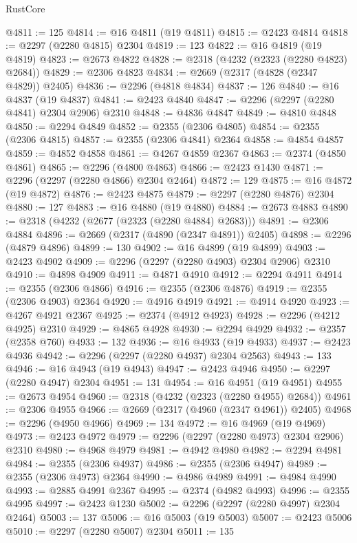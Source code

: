 \begin{lexlean}{RustCore}
\begin{coremodule}
@4811 := 125
@4814 := @16 @4811 (@19 @4811)
@4815 := @2423 @4814
@4818 := @2297 (@2280 @4815) @2304
@4819 := 123
@4822 := @16 @4819 (@19 @4819)
@4823 := @2673 @4822
@4828 := @2318 (@4232 (@2323 (@2280 @4823) @2684))
@4829 := @2306 @4823
@4834 := @2669 (@2317 (@4828 (@2347 @4829)) @2405)
@4836 := @2296 (@4818 @4834)
@4837 := 126
@4840 := @16 @4837 (@19 @4837)
@4841 := @2423 @4840
@4847 := @2296 (@2297 (@2280 @4841) @2304 @2906) @2310
@4848 := @4836 @4847
@4849 := @4810 @4848
@4850 := @2294 @4849
@4852 := @2355 (@2306 @4805)
@4854 := @2355 (@2306 @4815)
@4857 := @2355 (@2306 @4841) @2364
@4858 := @4854 @4857
@4859 := @4852 @4858
@4861 := @4267 @4859 @2367
@4863 := @2374 (@4850 @4861)
@4865 := @2296 (@4800 @4863)
@4866 := @2423 @1430
@4871 := @2296 (@2297 (@2280 @4866) @2304 @2464)
@4872 := 129
@4875 := @16 @4872 (@19 @4872)
@4876 := @2423 @4875
@4879 := @2297 (@2280 @4876) @2304
@4880 := 127
@4883 := @16 @4880 (@19 @4880)
@4884 := @2673 @4883
@4890 := @2318 (@4232 (@2677 (@2323 (@2280 @4884) @2683)))
@4891 := @2306 @4884
@4896 := @2669 (@2317 (@4890 (@2347 @4891)) @2405)
@4898 := @2296 (@4879 @4896)
@4899 := 130
@4902 := @16 @4899 (@19 @4899)
@4903 := @2423 @4902
@4909 := @2296 (@2297 (@2280 @4903) @2304 @2906) @2310
@4910 := @4898 @4909
@4911 := @4871 @4910
@4912 := @2294 @4911
@4914 := @2355 (@2306 @4866)
@4916 := @2355 (@2306 @4876)
@4919 := @2355 (@2306 @4903) @2364
@4920 := @4916 @4919
@4921 := @4914 @4920
@4923 := @4267 @4921 @2367
@4925 := @2374 (@4912 @4923)
@4928 := @2296 (@4212 @4925) @2310
@4929 := @4865 @4928
@4930 := @2294 @4929
@4932 := @2357 (@2358 @760)
@4933 := 132
@4936 := @16 @4933 (@19 @4933)
@4937 := @2423 @4936
@4942 := @2296 (@2297 (@2280 @4937) @2304 @2563)
@4943 := 133
@4946 := @16 @4943 (@19 @4943)
@4947 := @2423 @4946
@4950 := @2297 (@2280 @4947) @2304
@4951 := 131
@4954 := @16 @4951 (@19 @4951)
@4955 := @2673 @4954
@4960 := @2318 (@4232 (@2323 (@2280 @4955) @2684))
@4961 := @2306 @4955
@4966 := @2669 (@2317 (@4960 (@2347 @4961)) @2405)
@4968 := @2296 (@4950 @4966)
@4969 := 134
@4972 := @16 @4969 (@19 @4969)
@4973 := @2423 @4972
@4979 := @2296 (@2297 (@2280 @4973) @2304 @2906) @2310
@4980 := @4968 @4979
@4981 := @4942 @4980
@4982 := @2294 @4981
@4984 := @2355 (@2306 @4937)
@4986 := @2355 (@2306 @4947)
@4989 := @2355 (@2306 @4973) @2364
@4990 := @4986 @4989
@4991 := @4984 @4990
@4993 := @2885 @4991 @2367
@4995 := @2374 (@4982 @4993)
@4996 := @2355 @4995
@4997 := @2423 @1230
@5002 := @2296 (@2297 (@2280 @4997) @2304 @2464)
@5003 := 137
@5006 := @16 @5003 (@19 @5003)
@5007 := @2423 @5006
@5010 := @2297 (@2280 @5007) @2304
@5011 := 135

\end{coremodule}
\end{lexlean}
